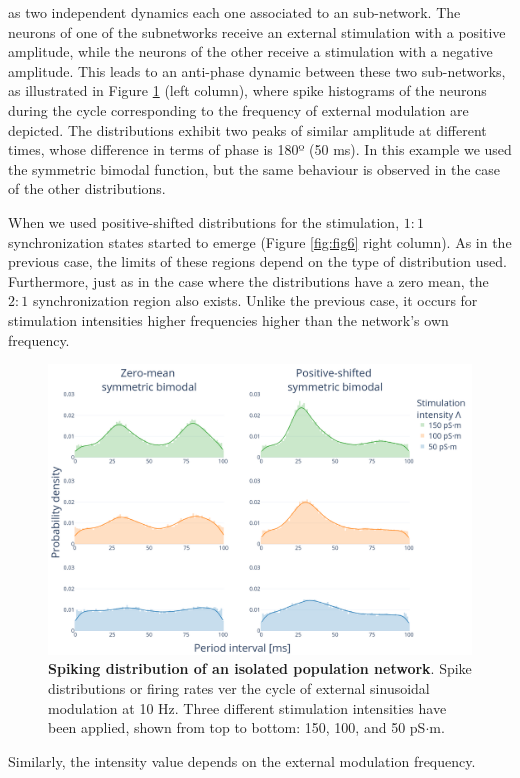\documentclass[../main.tex]{subfiles}
\begin{document}
as two independent dynamics each one associated to an  sub-network. 
The neurons of one of the subnetworks receive an external stimulation with a positive amplitude, while the neurons of the other receive a stimulation with a negative amplitude.
This leads to an anti-phase dynamic between these two sub-networks, as illustrated in Figure \ref{fig:fig7} (left column), where spike histograms of the neurons during the cycle corresponding to the frequency of external modulation are depicted.
The distributions exhibit two peaks of similar amplitude at different times, whose difference in terms of phase is 180º (50 ms).
In this example we used the symmetric bimodal function, but the same behaviour is observed in the case of the other distributions.

When we used positive-shifted distributions for the stimulation, $1:1$ synchronization states started to emerge (Figure \ref{fig:fig6} right column).
As in the previous case, the limits of these regions depend on the type of distribution used. Furthermore, just as in the case where the distributions have a zero mean, the $2:1$ synchronization region also exists.
Unlike the previous case, it occurs for stimulation intensities higher frequencies higher than the network's own frequency.
\begin{figure}[!htb]
    \centering
    \includegraphics[width=\textwidth]{chapter3/figures/histograms.png}
    \caption{\textbf{Spiking distribution of an isolated population network}.
    Spike distributions or firing rates ver the cycle of external sinusoidal modulation at 10 Hz.
    Three different stimulation intensities have been applied, shown from top to bottom: 150, 100, and 50 pS$\cdot$m.}
    \label{fig:fig7}
\end{figure}
Similarly, the intensity value depends on the external modulation frequency.
\end{document}
